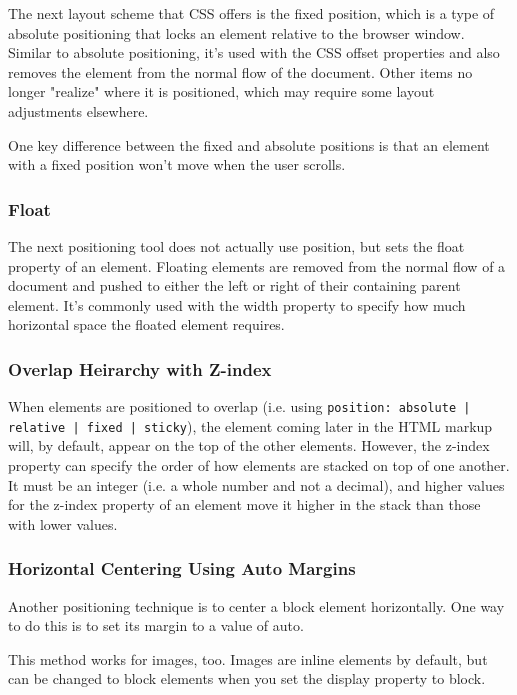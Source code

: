 The next layout scheme that CSS offers is the fixed position, which is a type of absolute positioning that locks an element relative to the browser window. Similar to absolute positioning, it's used with the CSS offset properties and also removes the element from the normal flow of the document. Other items no longer "realize" where it is positioned, which may require some layout adjustments elsewhere.

One key difference between the fixed and absolute positions is that an element with a fixed position won't move when the user scrolls.

\subsubsection{Float}
The next positioning tool does not actually use position, but sets the float property of an element. Floating elements are removed from the normal flow of a document and pushed to either the left or right of their containing parent element. It's commonly used with the width property to specify how much horizontal space the floated element requires.

\subsubsection{Overlap Heirarchy with Z-index}
When elements are positioned to overlap (i.e. using \texttt{position: absolute | relative | fixed | sticky}), the element coming later in the HTML markup will, by default, appear on the top of the other elements. However, the z-index property can specify the order of how elements are stacked on top of one another. It must be an integer (i.e. a whole number and not a decimal), and higher values for the z-index property of an element move it higher in the stack than those with lower values.


\subsubsection{Horizontal Centering Using Auto Margins}


Another positioning technique is to center a block element horizontally. One way to do this is to set its margin to a value of auto.

This method works for images, too. Images are inline elements by default, but can be changed to block elements when you set the display property to block.

